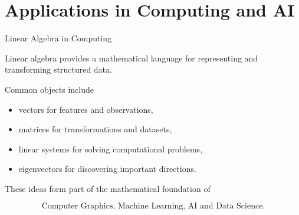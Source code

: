 

\section{Applications in Computing and AI}


\begin{frame}{Linear Algebra in Computing}

Linear algebra provides a mathematical language for
representing and transforming structured data.

\vspace{0.4cm}

Common objects include

\begin{itemize}
    \item vectors for features and observations,
    \item matrices for transformations and datasets,
    \item linear systems for solving computational problems,
    \item eigenvectors for discovering important directions.
\end{itemize}

\vspace{0.4cm}

These ideas form part of the mathematical foundation of

\[
\boxed{
\text{Computer Graphics, Machine Learning, AI and Data Science}.
}
\]

\end{frame}



